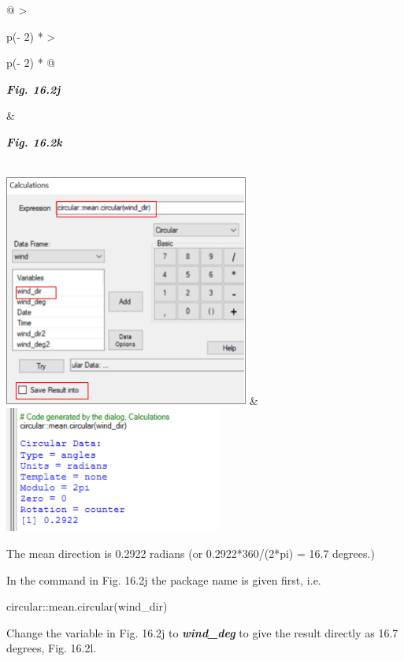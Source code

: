 \documentclass[
  letterpaper,
  DIV=11,
  numbers=noendperiod]{scrreprt}
\begin{document}
\begin{longtable}[]{@{}
  >{\raggedright\arraybackslash}p{(\columnwidth - 2\tabcolsep) * }
  >{\raggedright\arraybackslash}p{(\columnwidth - 2\tabcolsep) * }@{}}
\toprule\noalign{}
\begin{minipage}[b]{\linewidth}\raggedright
\textbf{\emph{Fig. 16.2j}}
\end{minipage} & \begin{minipage}[b]{\linewidth}\raggedright
\textbf{\emph{Fig. 16.2k}}
\end{minipage} \\
\midrule\noalign{}
\endhead
\bottomrule\noalign{}
\endlastfoot
\includegraphics[width=3.17135in,height=3.01584in]{figures/Fig16.2j.png}
&
\includegraphics[width=2.81028in,height=1.62732in]{figures/Fig16.2k.png} \\
\end{longtable}

The mean direction is 0.2922 radians (or 0.2922*360/(2*pi) = 16.7
degrees.)

In the command in Fig. 16.2j the package name is given first, i.e.

circular::mean.circular(wind\_dir)

Change the variable in Fig. 16.2j to \textbf{\emph{wind\_deg}} to give
the result directly as 16.7 degrees, Fig. 16.2l.
\end{document}
